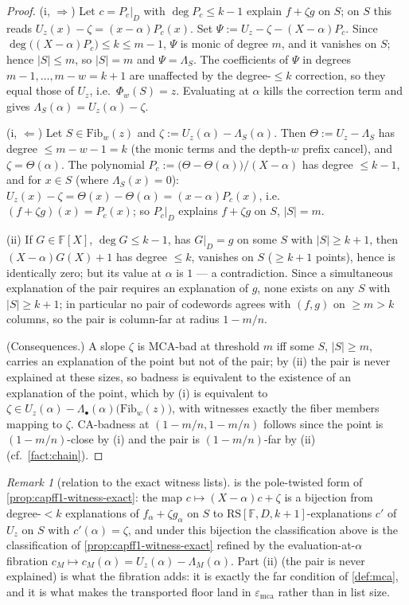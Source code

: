 \documentclass[11pt]{article}
\theoremstyle{definition}
\theoremstyle{remark}
\newtheorem{remark}[remark]{Remark}
\newcommand{\F}{\mathbb{F}}
\newcommand{\RS}{\mathrm{RS}}
\newcommand{\emca}{\varepsilon_{\mathrm{mca}}}
\begin{document}
\begin{proof}
(i, $\Rightarrow$)  Let $c=P_c|_D$ with $\deg P_c\leq k-1$ explain
$f+\zeta g$ on $S$; on $S$ this reads $U_z(x)-\zeta=(x-\alpha)P_c(x)$.  Set
$\Psi:=U_z-\zeta-(X-\alpha)P_c$.  Since
$\deg\big((X-\alpha)P_c\big)\leq k\leq m-1$, $\Psi$ is monic of degree $m$,
and it vanishes on $S$; hence $|S|\leq m$, so $|S|=m$ and
$\Psi=\Lambda_S$.  The coefficients of $\Psi$ in degrees
$m-1,\dots,m-w=k+1$ are unaffected by the degree-$\leq k$ correction, so
they equal those of $U_z$, i.e.\ $\Phi_w(S)=z$.  Evaluating at $\alpha$
kills the correction term and gives $\Lambda_S(\alpha)=U_z(\alpha)-\zeta$.

(i, $\Leftarrow$)  Let $S\in\mathrm{Fib}_w(z)$ and
$\zeta:=U_z(\alpha)-\Lambda_S(\alpha)$.  Then
$\Theta:=U_z-\Lambda_S$ has degree $\leq m-w-1=k$ (the monic terms and the
depth-$w$ prefix cancel), and $\zeta=\Theta(\alpha)$.  The polynomial
$P_c:=\big(\Theta-\Theta(\alpha)\big)/(X-\alpha)$ has degree $\leq k-1$, and
for $x\in S$ (where $\Lambda_S(x)=0$):
$U_z(x)-\zeta=\Theta(x)-\Theta(\alpha)=(x-\alpha)P_c(x)$, i.e.\
$(f+\zeta g)(x)=P_c(x)$; so $P_c|_D$ explains $f+\zeta g$ on $S$, $|S|=m$.

(ii)  If $G\in\F[X]$, $\deg G\leq k-1$, has $G|_D=g$ on some $S$ with
$|S|\geq k+1$, then $(X-\alpha)G(X)+1$ has degree $\leq k$, vanishes on $S$
($\geq k+1$ points), hence is identically zero; but its value at $\alpha$ is
$1$ --- a contradiction.  Since a simultaneous explanation of the pair
requires an explanation of $g$, none exists on any $S$ with $|S|\geq k+1$;
in particular no pair of codewords agrees with $(f,g)$ on $\geq m>k$
columns, so the pair is column-far at radius $1-m/n$.

(Consequences.)  A slope $\zeta$ is MCA-bad at threshold $m$ iff some
$S$, $|S|\geq m$, carries an explanation of the point but not of the pair;
by (ii) the pair is never explained at these sizes, so badness is
equivalent to the existence of an explanation of the point, which by (i) is
equivalent to $\zeta\in U_z(\alpha)-\Lambda_\bullet(\alpha)
\big(\mathrm{Fib}_w(z)\big)$, with witnesses exactly the fiber members
mapping to $\zeta$.  CA-badness at $(1-m/n,1-m/n)$ follows since the point
is $(1-m/n)$-close by (i) and the pair is $(1-m/n)$-far by (ii)
(cf.\ \cref{fact:chain}).
\end{proof}

\begin{remark}[relation to the exact witness lists]\label{rem:capg-witnessrel}
\Cref{lem:capg-witness} is the pole-twisted form of
\cref{prop:capff1-witness-exact}: the map $c\mapsto(X-\alpha)c+\zeta$ is a
bijection from degree-$<k$ explanations of $f_\alpha+\zeta g_\alpha$ on
$S$ to $\RS[\F,D,k+1]$-explanations $c'$ of $U_z$ on $S$ with
$c'(\alpha)=\zeta$, and under this bijection the classification above is
the classification of \cref{prop:capff1-witness-exact} refined by the
evaluation-at-$\alpha$ fibration $c_M\mapsto c_M(\alpha)
=U_z(\alpha)-\Lambda_M(\alpha)$.  Part \textup{(ii)} (the pair is never
explained) is what the fibration adds: it is exactly the far condition of
\cref{def:mca}, and it is what makes the transported floor land in
$\emca$ rather than in list size.
\end{remark}
\end{document}

